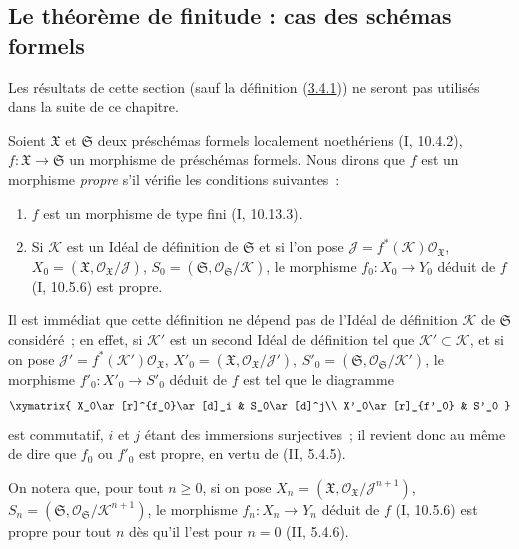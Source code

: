 \subsection{Le théorème de finitude : cas des schémas formels}
\label{subsection:III.3.4-fr}

Les résultats de cette section (sauf la définition
(\hyperref[III.3.4.1-fr]{3.4.1})) ne seront pas utilisés dans la suite de ce
chapitre.

\begin{env}[3.4.1]
\label{III.3.4.1-fr}
Soient $\mathfrak X$ et $\mathfrak S$ deux préschémas formels localement
noethériens (I, 10.4.2), $f:\mathfrak X\to\mathfrak S$ un morphisme de
préschémas formels. Nous dirons que $f$ est un morphisme \emph{propre} s'il
vérifie les conditions suivantes~:
\begin{enumerate}
\item[$1^\circ$] $f$ est un morphisme de type fini (I, 10.13.3).
\item[$2^\circ$] Si $\mathcal K$ est un Idéal de définition de $\mathfrak S$
et si l'on pose
$\mathcal J=f^*(\mathcal K)\mathcal O_{\mathfrak X}$,
$X_0=(\mathfrak X,\mathcal O_{\mathfrak X}/\mathcal J)$,
$S_0=(\mathfrak S,\mathcal O_{\mathfrak S}/\mathcal K)$, le morphisme
$f_0:X_0\to Y_0$ déduit de $f$ (I, 10.5.6) est propre.
\end{enumerate}

Il est immédiat que cette définition ne dépend pas de l'Idéal de définition
$\mathcal K$ de $\mathfrak S$ considéré~; en effet, si $\mathcal K'$ est un
second Idéal de définition tel que $\mathcal K'\subset\mathcal K$, et si on
pose $\mathcal J'=f^*(\mathcal K')\mathcal O_{\mathfrak X}$,
$X'_0=(\mathfrak X,\mathcal O_{\mathfrak X}/\mathcal J')$,
$S'_0=(\mathfrak S,\mathcal O_{\mathfrak S}/\mathcal K')$, le morphisme
$f'_0:X'_0\to S'_0$ déduit de $f$ est tel que le diagramme
\[
\xymatrix{
X_0\ar[r]^{f_0}\ar[d]_i & S_0\ar[d]^j\\
X'_0\ar[r]_{f'_0} & S'_0
}
\]
est commutatif, $i$ et $j$ étant des immersions surjectives~; il revient donc
au même de dire que $f_0$ ou $f'_0$ est propre, en vertu de (II, 5.4.5).

On notera que, pour tout $n\geq0$, si on pose
$X_n=(\mathfrak X,\mathcal O_{\mathfrak X}/\mathcal J^{n+1})$,
$S_n=(\mathfrak S,\mathcal O_{\mathfrak S}/\mathcal K^{n+1})$, le morphisme
$f_n:X_n\to Y_n$ déduit de $f$ (I, 10.5.6) est propre pour tout $n$ dès qu'il
l'est pour $n=0$ (II, 5.4.6).


\end{env}
